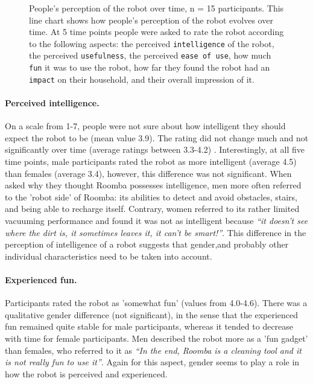 \documentclass{frontiersSCNS} %
\begin{document}
\begin{figure}[b]
    \caption{People's perception of the robot over time, n = 15 participants.
    This line chart shows how people's perception of the robot evolves over
    time. At 5 time points people were asked to rate the robot according to the
    following aspects: the perceived \texttt{intelligence} of the robot, the
    perceived \texttt{usefulness}, the perceived \texttt{ease of use}, how much
    \texttt{fun} it was to use the robot, how far they found the robot had an
    \texttt{impact} on their household, and their {overall} impression of it.}

    \label{fig:roomba-perception}
\end{figure}

\paragraph*{Perceived intelligence.} On a scale from 1-7, people were not sure
about how intelligent they should expect the robot to be (mean value 3.9). The
rating did not change much and not significantly over time (average ratings
between 3.3-4.2) \citep{fink_living_2013}. Interestingly, at all five time
points, male participants rated the robot as more intelligent (average 4.5) than
females (average 3.4), however, this difference was not significant. When asked
why they thought Roomba possesses intelligence, men more often referred to the
'robot side' of Roomba: its abilities to detect and avoid obstacles, stairs, and
being able to recharge itself. Contrary, women referred to its rather limited
vacuuming performance and found it was not as intelligent because \textit{``it
doesn't see where the dirt is, it sometimes leaves it, it can't be smart!''}.
This difference in the perception of intelligence of a robot suggests that
gender,and probably other individual characteristics need to be taken into
account.

\paragraph*{Experienced fun.} Participants rated the robot as 'somewhat fun'
(values from 4.0-4.6). There was a qualitative gender difference (not
significant), in the sense that the experienced fun remained quite stable for
male participants, whereas it tended to decrease with time for female
participants. Men described the robot more as a 'fun gadget' than females, who
referred to it as \textit{``In the end, Roomba is a cleaning tool and it is not
really fun to use it''}. Again for this aspect, gender seems to play a role in
how the robot is perceived and experienced.\\
\end{document}
